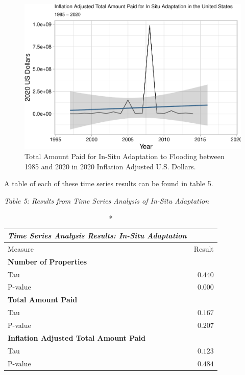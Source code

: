 \documentclass[
  12pt,
]{article}
\begin{document}
\begin{figure}
\centering
\includegraphics{finalreport_files/figure-latex/unnamed-chunk-21-1.pdf}
\caption{Total Amount Paid for In-Situ Adaptation to Flooding between
1985 and 2020 in 2020 Inflation Adjusted U.S. Dollars.}
\end{figure}

A table of each of these time series results can be found in table 5.

\newline

\emph{Table 5: Results from Time Series Analysis of In-Situ
Adaptation}\\
\captionsetup[table]{labelformat=empty,skip=1pt}

\begin{longtable}{lr}
\caption*{
{\large \emph{\textbf{Time Series Analysis Results: In-Situ Adaptation}}}
} \\ 
\toprule
Measure & Result \\ 
\midrule
\multicolumn{1}{l}{\textbf{Number of Properties}} \\ 
\midrule
Tau & $0.440$ \\ 
P-value & $0.000$ \\ 
\midrule
\multicolumn{1}{l}{\textbf{Total Amount Paid}} \\ 
\midrule
Tau & $0.167$ \\ 
P-value & $0.207$ \\ 
\midrule
\multicolumn{1}{l}{\textbf{Inflation Adjusted Total Amount Paid}} \\ 
\midrule
Tau & $0.123$ \\ 
P-value & $0.484$ \\ 
\bottomrule
\end{longtable}
\end{document}
